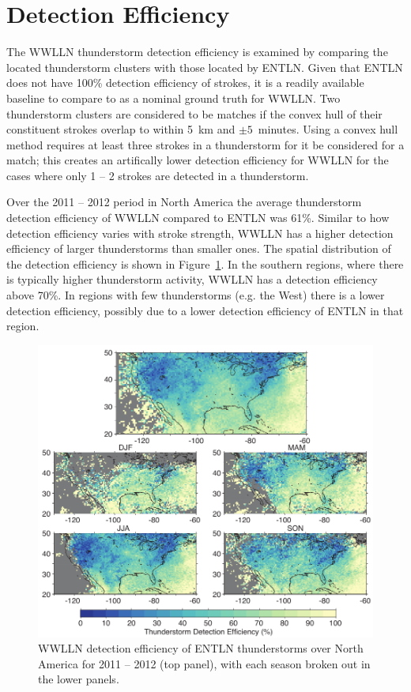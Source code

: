 \section{Detection Efficiency}

The WWLLN thunderstorm detection efficiency is examined by comparing the located thunderstorm clusters with those located by ENTLN.
Given that ENTLN does not have 100\% detection efficiency of strokes, it is a readily available baseline to compare to as a nominal ground truth for WWLLN.
Two thunderstorm clusters are considered to be matches if the convex hull of their constituent strokes overlap to within 5~km and $\pm5$~minutes.
Using a convex hull method requires at least three strokes in a thunderstorm for it be considered for a match; this creates an artifically lower detection efficiency for WWLLN for the cases where only 1 -- 2 strokes are detected in a thunderstorm.

Over the 2011 -- 2012 period in North America the average thunderstorm detection efficiency of WWLLN compared to ENTLN was 61\%.
Similar to how detection efficiency varies with stroke strength, WWLLN has a higher detection efficiency of larger thunderstorms than smaller ones.
The spatial distribution of the detection efficiency is shown in Figure~\ref{deMap}.
In the southern regions, where there is typically higher thunderstorm activity, WWLLN has a detection efficiency above 70\%.
In regions with few thunderstorms (e.g. the West) there is a lower detection efficiency, possibly due to a lower detection efficiency of ENTLN in that region.

\begin{figure}[ht!]
   \centering
   \includegraphics[scale=1]{thunderstorm/Figures/deMap.pdf}
   \caption{WWLLN detection efficiency of ENTLN thunderstorms over North America for 2011 -- 2012 (top panel), with each season broken out in the lower panels.}
   \label{deMap}
\end{figure}

